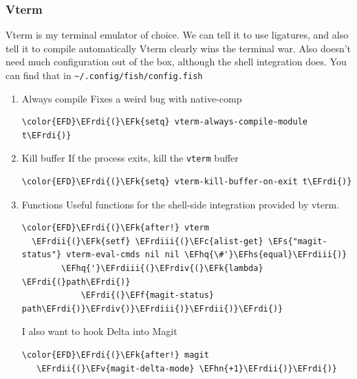 \documentclass{scrartcl}
\newcommand{\EFk}[1]{\textcolor{EFk}{#1}} %
\newcommand{\EFs}[1]{\textcolor{EFs}{#1}} %
\newcommand{\EFc}[1]{\textcolor{EFc}{#1}} %
\newcommand{\EFv}[1]{\textcolor{EFv}{#1}} %
\newcommand{\EFf}[1]{\textcolor{EFf}{#1}} %
\newcommand{\EFhn}[1]{#1} %
\newcommand{\EFhq}[1]{#1} %
\newcommand{\EFhs}[1]{#1} %
\newcommand{\EFrdi}[1]{#1} %
\newcommand{\EFrdii}[1]{#1} %
\newcommand{\EFrdiii}[1]{#1} %
\newcommand{\EFrdiv}[1]{#1} %
\begin{document}
\subsubsection{Vterm}
\label{sec:orgd3b5c16}
Vterm is my terminal emulator of choice. We can tell it to use ligatures, and also tell it to compile automatically
Vterm clearly wins the terminal war. Also doesn't need much configuration out of
the box, although the shell integration does. You can find that in \texttt{\textasciitilde{}/.config/fish/config.fish}
\begin{enumerate}
\item Always compile
\label{sec:org0a7b409}
Fixes a weird bug with native-comp
\begin{Code}
\begin{Verbatim}[]
\color{EFD}\EFrdi{(}\EFk{setq} vterm-always-compile-module t\EFrdi{)}
\end{Verbatim}
\end{Code}

\item Kill buffer
\label{sec:orgf1c4bfa}
If the process exits, kill the \texttt{vterm} buffer
\begin{Code}
\begin{Verbatim}[]
\color{EFD}\EFrdi{(}\EFk{setq} vterm-kill-buffer-on-exit t\EFrdi{)}
\end{Verbatim}
\end{Code}

\item Functions
\label{sec:orgb810783}
Useful functions for the shell-side integration provided by vterm.
\begin{Code}
\begin{Verbatim}[]
\color{EFD}\EFrdi{(}\EFk{after!} vterm
  \EFrdii{(}\EFk{setf} \EFrdiii{(}\EFc{alist-get} \EFs{"magit-status"} vterm-eval-cmds nil nil \EFhq{\#'}\EFhs{equal}\EFrdiii{)}
        \EFhq{'}\EFrdiii{(}\EFrdiv{(}\EFk{lambda} \EFrdi{(}path\EFrdi{)}
            \EFrdi{(}\EFf{magit-status} path\EFrdi{)}\EFrdiv{)}\EFrdiii{)}\EFrdii{)}\EFrdi{)}
\end{Verbatim}
\end{Code}

I also want to hook Delta into Magit
\begin{Code}
\begin{Verbatim}[]
\color{EFD}\EFrdi{(}\EFk{after!} magit
   \EFrdii{(}\EFv{magit-delta-mode} \EFhn{+1}\EFrdii{)}\EFrdi{)}
\end{Verbatim}
\end{Code}


\end{enumerate}
\end{document}
